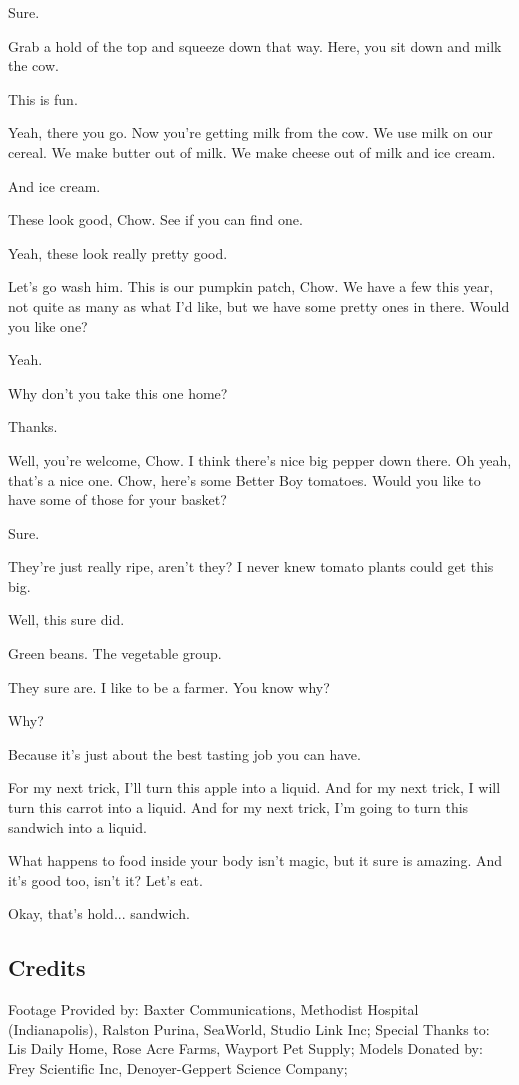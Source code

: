 Sure.

Grab a hold of the top and squeeze down that way. Here, you sit down and milk the cow.

This is fun.

Yeah, there you go. Now you're getting milk from the cow. We use milk on our cereal. We make butter out of milk. We make cheese out of milk and ice cream.

And ice cream.

These look good, Chow. See if you can find one.

Yeah, these look really pretty good.

Let's go wash him. This is our pumpkin patch, Chow. We have a few this year, not quite as many as what I'd like, but we have some pretty ones in there. Would you like one?

Yeah.

Why don't you take this one home?

Thanks.

Well, you're welcome, Chow. I think there's nice big pepper down there. Oh yeah, that's a nice one. Chow, here's some Better Boy tomatoes. Would you like to have some of those for your basket?

Sure.

They're just really ripe, aren't they? I never knew tomato plants could get this big.

Well, this sure did.

Green beans. The vegetable group.

They sure are. I like to be a farmer. You know why?

Why?

Because it's just about the best tasting job you can have.

For my next trick, I'll turn this apple into a liquid. And for my next trick, I will turn this carrot into a liquid. And for my next trick, I'm going to turn this sandwich into a liquid.

What happens to food inside your body isn't magic, but it sure is amazing. And it's good too, isn't it? Let's eat.

Okay, that's hold... sandwich.

\subsection{Credits}

Footage Provided by: Baxter Communications, Methodist Hospital (Indianapolis), Ralston Purina, SeaWorld, Studio Link Inc;
Special Thanks to: Lis Daily Home, Rose Acre Farms, Wayport Pet Supply;
Models Donated by: Frey Scientific Inc, Denoyer-Geppert Science Company;

